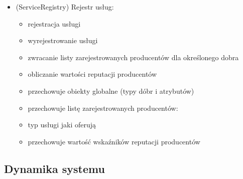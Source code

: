 \documentclass[a4paper,12pt]{article}
\begin{document}
\begin{itemize}
\item (ServiceRegistry) Rejestr usług:
	\begin{itemize}
	\item rejestracja usługi
	\item wyrejestrowanie usługi
	\item zwracanie listy zarejestrowanych producentów dla określonego dobra
	\item obliczanie wartości reputacji producentów
	\item przechowuje obiekty globalne (typy dóbr i atrybutów)
	\item przechowuje listę zarejestrowanych producentów:
	\item typ usługi jaki oferują
	\item przechowuje wartość wskaźników reputacji producentów
	\end{itemize}
\end{itemize}

\newpage

\subsection{Dynamika systemu}
\end{document}
